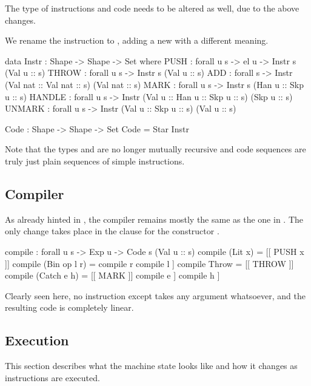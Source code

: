 The type of instructions and code needs to be altered as well, due to the above
changes.

We rename the instruction  to , adding a new
 with a different meaning.

\begin{code}
  data Instr : Shape -> Shape -> Set where
    PUSH : forall {u s} -> el u -> Instr s (Val u :: s)
    THROW : forall {u s} -> Instr s (Val u :: s)
    ADD : forall {s} -> Instr (Val nat :: Val nat :: s) (Val nat :: s)
    MARK : forall {u s} -> Instr s (Han u :: Skp u :: s)
    HANDLE : forall {u s} -> Instr (Val u :: Han u :: Skp u :: s) (Skp u :: s)
    UNMARK : forall {u s} -> Instr (Val u :: Skp u :: s) (Val u :: s)
\end{code}\label{sec:lin-code}
\begin{code}
  Code : Shape -> Shape -> Set
  Code = Star Instr
\end{code}
\noindent Note that the types  and  are no longer mutually recursive
and code sequences are truly just plain sequences of simple instructions.

\subsection{Compiler}

As already hinted in , the compiler remains
mostly the same as the one in . The only change takes
place in the clause for the constructor .

\label{sec:lin-compile}\begin{code}
  compile : forall {u s} -> Exp u -> Code s (Val u :: s)
  compile (Lit x) = [[ PUSH x ]]
  compile (Bin op l r) = compile r \app compile l \app [[ opInstr op ]] 
  compile Throw = [[ THROW ]]
  compile (Catch e h) =
      [[ MARK ]] \app compile e \app [[ HANDLE ]] \app compile h \app [[ UNMARK ]]
\end{code}

Clearly seen here, no instruction except  takes any argument whatsoever,
and the resulting code is completely linear.

\subsection{Execution}

This section describes what the machine state looks like and how it changes as
instructions are executed.

